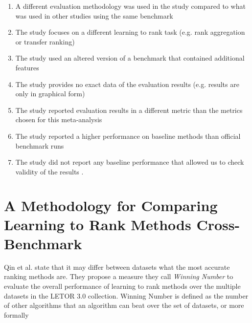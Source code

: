 \documentclass[english, authoryear, preprint]{elsarticle}
\begin{document}
\begin{enumerate}
\item A different evaluation methodology was used in the study compared to what was used in other studies using the same benchmark \cite{Geng2011, Lin2012}
\item The study focuses on a different learning to rank task (e.g. rank aggregation or transfer ranking) \cite{De2011, De2010, Derhami2013, De2012, Chen2010, Ah-Pine2008, Wang2009c, De2013, Miao2013, Hoi2008, De2012b, Duh2011b, Argentini2012, Qin2010c, Volkovs2013, Desarkar2011, Pan2013, Lin2011b, Volkovs2012, Dammak2011}
\item The study used an altered version of a benchmark that contained additional features \cite{Bidoki2009, Ding2010}
\item The study provides no exact data of the evaluation results (e.g. results are only in graphical form) \cite{Wang2008, Wang2010, Xu2010, Kuo2009, Li2008, Xia2008, Zhou2011, Wu2011, Zhu2009, Karimzadehgan2011, Swersky2012, Pan2011, Ni2008, Ciaramita2008, Stewart2012, Petterson2009, Agarwal2010, Chang2009, Qin2008c, Adams2011, Sculley2009, Huang2008, Alejo2010, Sun2011, He2010b, Benbouzid2012, Geng2012, Chen2012, Xu2012, Shivaswamy2011}
\item The study reported evaluation results in a different metric than the metrics chosen for this meta-analysis \cite{Yu2009, Thuy2009, Pahikkala2009, Kersting2009, Mohan2011}
\item The study reported a higher performance on baseline methods than official benchmark runs \cite{Dubey2009, Banerjee2009, Peng2010b, Song2014, Bian2010, Bian2010b, Carvalho2008, Acharyya2012, Peng2010b, Tran2012, Asadi2013c}
\item The study did not report any baseline performance that allowed us to check validity of the results \cite{Chakrabarti2008, Wang2012b, Buffoni2011}.
\end{enumerate}

\section{A Methodology for Comparing Learning to Rank Methods Cross-Benchmark}
Qin et al. \cite{Qin2010} state that it may differ between datasets what the most accurate ranking methods are. They propose a measure they call \emph{Winning Number} to evaluate the overall performance of learning to rank methods over the multiple datasets in the LETOR 3.0 collection. Winning Number is defined as the number of other algorithms that an algorithm can beat over the set of datasets, or more formally\\
\end{document}
